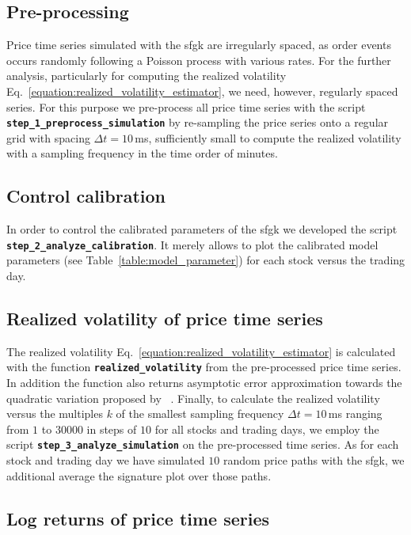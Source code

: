 \documentclass[11pt, a4paper]{thesis}  %
\begin{document}
\subsection{Pre-processing} 

Price time series simulated with the \ac{sfgk} are irregularly spaced, as order events occurs randomly following a Poisson process with various rates. For the further analysis, particularly for computing the realized volatility Eq.~\ref{equation:realized_volatility_estimator}, we need, however, regularly spaced series. For this purpose we pre-process all price time series with the script {\bf \texttt{step\_1\_preprocess\_simulation}} by re-sampling the price series onto a regular grid with spacing $\Delta t=10\,$ms, sufficiently small to compute the realized volatility with a sampling frequency in the time order of minutes. 

\subsection{Control calibration} 

In order to control the calibrated parameters of the  \ac{sfgk} we developed the script {\bf \texttt{step\_2\_analyze\_calibration}}. It merely allows to plot the calibrated model parameters (see Table~\ref{table:model_parameter}) for each stock versus the trading day.

\subsection{Realized volatility of price time series} 

The realized volatility Eq.~\ref{equation:realized_volatility_estimator} is calculated with the function {\bf \texttt{realized\_volatility}} from the pre-processed price time series. In addition the function also returns asymptotic error approximation  towards the quadratic variation  proposed by \citeauthor{BarndorffNielsen:2002:EcoAnalysis}~\cite{BarndorffNielsen:2002:EcoAnalysis}. Finally, to calculate the realized volatility versus the multiples $k$ of the smallest sampling frequency $\Delta t=10\,$ms ranging from $1$ to  $30000$ in steps of $10$ for all stocks and trading days, we employ the script {\bf \texttt{step\_3\_analyze\_simulation}} on the pre-processed time series. As for each stock and trading day we have simulated $10$ random price paths with the \ac{sfgk}, we additional average the signature plot over those paths.

\subsection{Log returns of price time series} 
\end{document}
